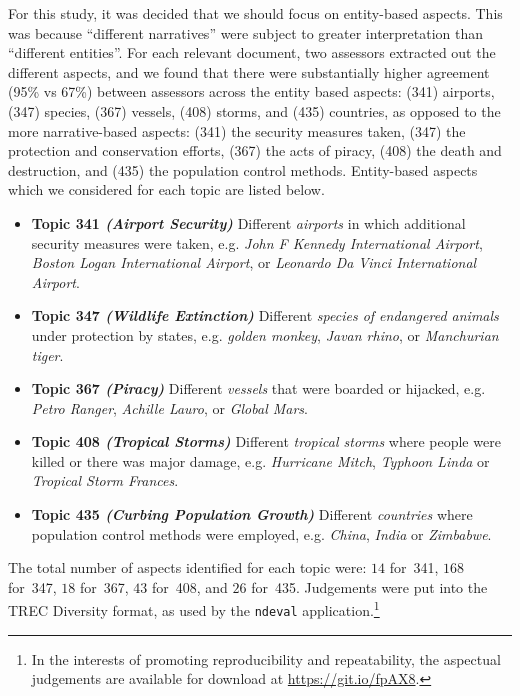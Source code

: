 For this study, it was decided that we should focus on entity-based aspects. This was because ``different narratives'' were subject to greater interpretation than ``different entities''. For each relevant document, two assessors extracted out the different aspects, and we found that there were substantially higher agreement (95\% vs 67\%) between assessors across the entity based aspects: (341) airports, (347) species, (367) vessels, (408) storms, and  (435) countries, as opposed to the more narrative-based aspects: (341) the security measures taken, (347) the protection and conservation efforts, (367) the acts of piracy, (408) the death and destruction, and (435) the population control methods.  Entity-based aspects which we considered for each topic are listed below.

\begin{itemize}
    \item{\textbf{Topic 341 \emph{(Airport Security)}} Different \emph{airports} in which additional security measures were taken, e.g. \emph{John F Kennedy International Airport}, \emph{Boston Logan International Airport}, or \emph{Leonardo Da Vinci International Airport}.}
    \item{\textbf{Topic 347 \emph{(Wildlife Extinction)}} Different \emph{species of endangered animals} under protection by states, e.g. \emph{golden monkey}, \emph{Javan rhino}, or \emph{Manchurian tiger}.}
    \item{\textbf{Topic 367 \emph{(Piracy)}} Different \emph{vessels} that were boarded or hijacked, e.g. \emph{Petro Ranger}, \emph{Achille Lauro}, or \emph{Global Mars}.}
    \item{\textbf{Topic 408 \emph{(Tropical Storms)}} Different \emph{tropical storms} where people were killed or there was major damage, e.g. \emph{Hurricane Mitch}, \emph{Typhoon Linda} or \emph{Tropical Storm Frances}.}
    \item{\textbf{Topic 435 \emph{(Curbing Population Growth)}} Different \emph{countries} where population control methods were employed, e.g. \emph{China}, \emph{India} or \emph{Zimbabwe}.}
\end{itemize}

The total number of aspects identified for each topic were: $14$ for~341, $168$ for~347, $18$ for~367, $43$ for~408, and $26$ for~435. Judgements were put into the TREC Diversity format, as used by the \texttt{ndeval} application.\footnote{In the interests of promoting reproducibility and repeatability, the aspectual judgements are available for download at \url{https://git.io/fpAX8}.} %

